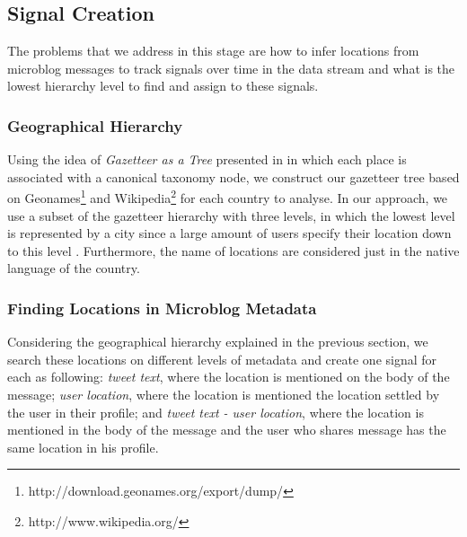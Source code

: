 \documentclass{llncs}
\begin{document}
\subsection{Signal Creation}
The problems that we address in this stage are how to infer locations from microblog messages to track signals over time in the data stream and what is the lowest hierarchy level to find and assign to these signals.

\subsubsection{Geographical Hierarchy}\label{sssec:geohie}
Using the idea of \textit{Gazetteer as a Tree} presented in \cite{yin2014pinpointing} in which each place is associated with a canonical taxonomy node, we construct our gazetteer tree based on Geonames\footnote{http://download.geonames.org/export/dump/} and Wikipedia\footnote{http://www.wikipedia.org/} for each country to analyse. In our approach, we use a subset of the gazetteer hierarchy with three levels, in which the lowest level is represented by a city since a large amount of users specify their location down to this level \cite{hecht2011tweets}. Furthermore, the name of locations are considered just in the native language of the country.

\subsubsection{Finding Locations in Microblog Metadata}

Considering the geographical hierarchy explained in the previous section, we search these locations on different levels of metadata and create one signal for each as following: \textit{tweet text}, where the location is mentioned on the body of the message; \textit{user location}, where the location is mentioned the location settled by the user in their profile; and \textit{tweet text - user location}, where the location  is mentioned in the body of the message and the user who shares message has the same location in his profile.

\end{document}
